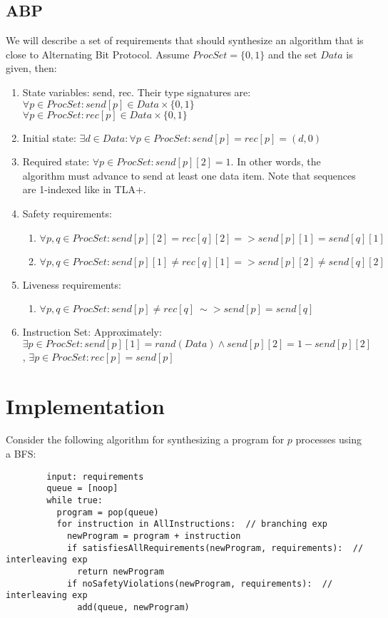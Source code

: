 \documentclass[12pt]{article}
\begin{document}
\subsection{ABP}
We will describe a set of requirements that should synthesize an algorithm that is close to Alternating Bit Protocol.  Assume $ProcSet = \{0,1\}$ and the set $Data$ is given, then:
	\begin{enumerate}
		\item State variables: send, rec.  Their type signatures are: \\
				$\forall p \in ProcSet : send[p] \in Data \times \{0,1\}$ \\
				$\forall p \in ProcSet : rec[p] \in Data \times \{0,1\}$
		\item Initial state: $\exists d \in Data : \forall p \in ProcSet : send[p] = rec[p] = (d,0)$
		\item Required state: $\forall p \in ProcSet : send[p][2] = 1$.  In other words, the algorithm must advance to send at least one data item.  Note that sequences are 1-indexed like in TLA+.  
		\item Safety requirements:
			\begin{enumerate}
				\item $\forall p,q \in ProcSet : send[p][2] = rec[q][2] => send[p][1] = send[q][1]$
				\item $\forall p,q \in ProcSet : send[p][1] \neq rec[q][1] => send[p][2] \neq send[q][2]$
			\end{enumerate}
		\item Liveness requirements:
			\begin{enumerate}
				\item $\forall p,q \in ProcSet : send[p] \neq rec[q] ~\sim> send[p] = send[q]$
			\end{enumerate}
		\item Instruction Set: Approximately: $\exists p \in ProcSet : send[p][1] = rand(Data) \wedge send[p][2] = 1-send[p][2]$, $\exists p \in ProcSet : rec[p] = send[p]$
	\end{enumerate}


\section{Implementation}
Consider the following algorithm for synthesizing a program for $p$ processes using a BFS:
	\begin{verbatim}
		input: requirements
		queue = [noop]
		while true:
		  program = pop(queue)
		  for instruction in AllInstructions:  // branching exp
		    newProgram = program + instruction
		    if satisfiesAllRequirements(newProgram, requirements):  // interleaving exp
		      return newProgram
		    if noSafetyViolations(newProgram, requirements):  // interleaving exp
		      add(queue, newProgram)
	\end{verbatim}
\end{document}
